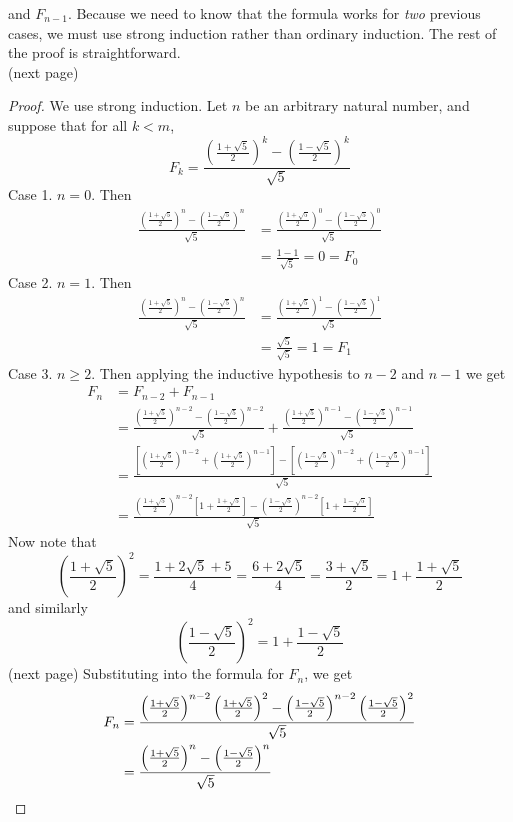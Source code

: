 \documentclass{report}
\theoremstyle{definition}
\begin{document}
and $F_{n-1}$. Because we need to know that the formula works for \textit{two} previous cases, we must use strong induction rather than ordinary induction. 
The rest of the proof is straightforward.\\
(next page)\newpage
\begin{proof}
We use strong induction. Let $n$ be an arbitrary natural number, and suppose that for all $k<m$,
\begin{equation*}
F_k=\frac{
\left(\frac{1+\sqrt{5}}{2}\right)^k-\left(\frac{1-\sqrt{5}}{2}\right)^k}{\sqrt{5}}
\end{equation*}
Case 1. $n=0$. Then
\begin{align*}
\frac{\left(\frac{1+\sqrt{5}}{2}\right)^n-\left(\frac{1-\sqrt{5}}{2}\right)^n}{\sqrt{5}}
&=\frac{\left(\frac{1+\sqrt{5}}{2}\right)^0-\left(\frac{1-\sqrt{5}}{2}\right)^0}{\sqrt{5}}\\
&=\frac{1-1}{\sqrt5}=0=F_0
\end{align*}
Case 2. $n=1$. Then
\begin{align*}
\frac{\left(\frac{1+\sqrt{5}}{2}\right)^n-\left(\frac{1-\sqrt{5}}{2}\right)^n}{\sqrt{5}}
&=\frac{\left(\frac{1+\sqrt{5}}{2}\right)^1-\left(\frac{1-\sqrt{5}}{2}\right)^1}{\sqrt{5}}\\
&=\frac{\sqrt5}{\sqrt5}=1=F_1
\end{align*}
Case 3. $n\geq2$. Then applying the inductive hypothesis to $n-2$ and $n-1$ we get
\begin{align*}
F_n&=F_{n-2}+F_{n-1}\\
&=\frac{\left(\frac{1+\sqrt{5}}{2}\right)^{n-2}-\left(\frac{1-\sqrt{5}}{2}\right)^{n-2}}{\sqrt{5}}
+\frac{\left(\frac{1+\sqrt{5}}{2}\right)^{n-1}-\left(\frac{1-\sqrt{5}}{2}\right)^{n-1}}{\sqrt{5}}\\
&=\frac{\left[\left(\frac{1+\sqrt{5}}{2}\right)^{n-2}+\left(\frac{1+\sqrt{5}}{2}\right)^{n-1}\right]-\left[\left(\frac{1-\sqrt{5}}{2}\right)^{n-2}+\left(\frac{1-\sqrt{5}}{2}\right)^{n-1}\right]}
{\sqrt{5}}\\
&=\frac{\left(\frac{1+\sqrt{5}}{2}\right)^{n-2}\left[1+\frac{1+\sqrt{5}}{2}\right]-\left(\frac{1-\sqrt{5}}{2}\right)^{n-2}\left[1+\frac{1-\sqrt{5}}{2}\right]}{\sqrt5}
\end{align*}
Now note that 
\begin{equation*}
\left(\frac{1+\sqrt{5}}{2}\right)^{2}=\frac{1+2\sqrt5+5}{4}=\frac{6+2\sqrt5}{4}=\frac{3+\sqrt5}{2}
=1+\frac{1+\sqrt5}{2}
\end{equation*}
and similarly
\begin{equation*}
\left(\frac{1-\sqrt{5}}{2}\right)^{2}=1+\frac{1-\sqrt5}{2}
\end{equation*}
(next page)\newpage
\noindent Substituting into the formula for $F_n$, we get
\begin{align*}
F_n&=\frac{\left(\frac{1+\sqrt{5}}{2}\right)^{n-2}\left(\frac{1+\sqrt{5}}{2}\right)^{2}-\left(\frac{1-\sqrt{5}}{2}\right)^{n-2}\left(\frac{1-\sqrt{5}}{2}\right)^{2}}{\sqrt5}\\
&=\frac{\left(\frac{1+\sqrt{5}}{2}\right)^{n}-\left(\frac{1-\sqrt{5}}{2}\right)^{n}}{\sqrt5}\qedhere
\end{align*}
\end{proof}
\newpage
\end{document}
